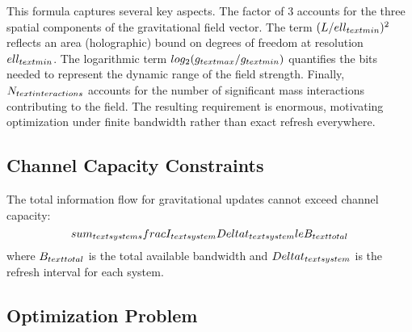 \documentclass[twocolumn,prd,amsmath,amssymb,aps,superscriptaddress,nofootinbib]{revtex4-2}
\begin{document}
This formula captures several key aspects. The factor of 3 accounts for the three spatial components of the gravitational field vector. The term $(L/\\ell_{\\text{min}})^2$ reflects an area (holographic) bound on degrees of freedom at resolution $\\ell_{\\text{min}}$. The logarithmic term $\\log_2(g_{\\text{max}}/g_{\\text{min}})$ quantifies the bits needed to represent the dynamic range of the field strength. Finally, $N_{\\text{interactions}}$ accounts for the number of significant mass interactions contributing to the field. The resulting requirement is enormous, motivating optimization under finite bandwidth rather than exact refresh everywhere.

\subsection{Channel Capacity Constraints}

The total information flow for gravitational updates cannot exceed channel capacity:
\begin{equation}
\\sum_{\\text{systems}} \\frac{I_{\\text{system}}}{\\Delta t_{\\text{system}}} \\le B_{\\text{total}}
\end{equation}
where $B_{\\text{total}}$ is the total available bandwidth and $\\Delta t_{\\text{system}}$ is the refresh interval for each system.

\subsection{Optimization Problem}
\end{document}
